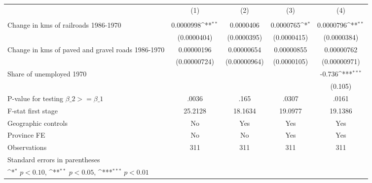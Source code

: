 {
\def\sym#1{\ifmmode^{#1}\else\(^{#1}\)\fi}
\begin{tabular}{l*{4}{c}}
\hline\hline
                &\multicolumn{1}{c}{(1)}&\multicolumn{1}{c}{(2)}&\multicolumn{1}{c}{(3)}&\multicolumn{1}{c}{(4)}\\
                &\multicolumn{1}{c}{}&\multicolumn{1}{c}{}&\multicolumn{1}{c}{}&\multicolumn{1}{c}{}\\
\hline
Change in kms of railroads 1986-1970&0.0000998\sym{**} &0.0000406         &0.0000765\sym{*}  &0.0000796\sym{**} \\
                &(0.0000404)         &(0.0000395)         &(0.0000415)         &(0.0000384)         \\
[1em]
Change in kms of paved and gravel roads 1986-1970&0.00000196         &0.00000654         &0.00000855         &0.00000762         \\
                &(0.00000724)         &(0.00000964)         &(0.0000105)         &(0.00000971)         \\
[1em]
Share of unemployed 1970&                  &                  &                  &   -0.736\sym{***}\\
                &                  &                  &                  &  (0.105)         \\
\hline
P-value for testing $\beta\_{2} >= \beta\_{1}$&    .0036         &     .165         &    .0307         &    .0161         \\
F-stat first stage&  25.2128         &  18.1634         &  19.0977         &  19.1386         \\
Geographic controls&       No         &      Yes         &      Yes         &      Yes         \\
Province FE     &       No         &       No         &      Yes         &      Yes         \\
Observations    &      311         &      311         &      311         &      311         \\
\hline\hline
\multicolumn{5}{l}{\footnotesize Standard errors in parentheses}\\
\multicolumn{5}{l}{\footnotesize \sym{*} \(p<0.10\), \sym{**} \(p<0.05\), \sym{***} \(p<0.01\)}\\
\end{tabular}
}
